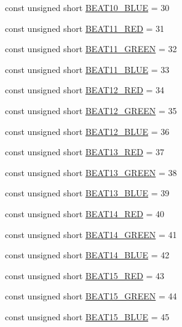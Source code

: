 \begin{DoxyCompactItemize}
\item 
const unsigned short \hyperlink{namespaceoutputs_a188668f7db5d9610361658c817b08574}{B\+E\+A\+T10\+\_\+\+B\+L\+UE} = 30
\item 
const unsigned short \hyperlink{namespaceoutputs_a3b55bd1a681764d7655dfee327930872}{B\+E\+A\+T11\+\_\+\+R\+ED} = 31
\item 
const unsigned short \hyperlink{namespaceoutputs_a38945c3c9766ee86e3c97a79e2be45c1}{B\+E\+A\+T11\+\_\+\+G\+R\+E\+EN} = 32
\item 
const unsigned short \hyperlink{namespaceoutputs_a31d60b8c00551d3dbeca8645eba200eb}{B\+E\+A\+T11\+\_\+\+B\+L\+UE} = 33
\item 
const unsigned short \hyperlink{namespaceoutputs_a3138968cd14e309f1e88228bd1259f3f}{B\+E\+A\+T12\+\_\+\+R\+ED} = 34
\item 
const unsigned short \hyperlink{namespaceoutputs_a863de14249bb5dd32b6fb2dd665f804e}{B\+E\+A\+T12\+\_\+\+G\+R\+E\+EN} = 35
\item 
const unsigned short \hyperlink{namespaceoutputs_ae7b144325945c1712151bf0d6a363c5f}{B\+E\+A\+T12\+\_\+\+B\+L\+UE} = 36
\item 
const unsigned short \hyperlink{namespaceoutputs_a34ead0f387c2557f9d74d57186f1578f}{B\+E\+A\+T13\+\_\+\+R\+ED} = 37
\item 
const unsigned short \hyperlink{namespaceoutputs_a3410f51b9ac465ad73e71e8bd54b3ab4}{B\+E\+A\+T13\+\_\+\+G\+R\+E\+EN} = 38
\item 
const unsigned short \hyperlink{namespaceoutputs_a38a0eba17cc5ed8eed42c37dca1feb3f}{B\+E\+A\+T13\+\_\+\+B\+L\+UE} = 39
\item 
const unsigned short \hyperlink{namespaceoutputs_ae72dd425b992846bc954f41227bdda1a}{B\+E\+A\+T14\+\_\+\+R\+ED} = 40
\item 
const unsigned short \hyperlink{namespaceoutputs_a181a1c13a2964de30df1c57bae8f8428}{B\+E\+A\+T14\+\_\+\+G\+R\+E\+EN} = 41
\item 
const unsigned short \hyperlink{namespaceoutputs_ab384095ae250cb117a95683710620188}{B\+E\+A\+T14\+\_\+\+B\+L\+UE} = 42
\item 
const unsigned short \hyperlink{namespaceoutputs_a6cdbcf8d70f85316af1ea2b96d9b72bd}{B\+E\+A\+T15\+\_\+\+R\+ED} = 43
\item 
const unsigned short \hyperlink{namespaceoutputs_afacd3fd74ab006d3ce548b672c3ab2f7}{B\+E\+A\+T15\+\_\+\+G\+R\+E\+EN} = 44
\item 
const unsigned short \hyperlink{namespaceoutputs_a6d12c95904da18827ed262896b9ebaa1}{B\+E\+A\+T15\+\_\+\+B\+L\+UE} = 45

\end{DoxyCompactItemize}
